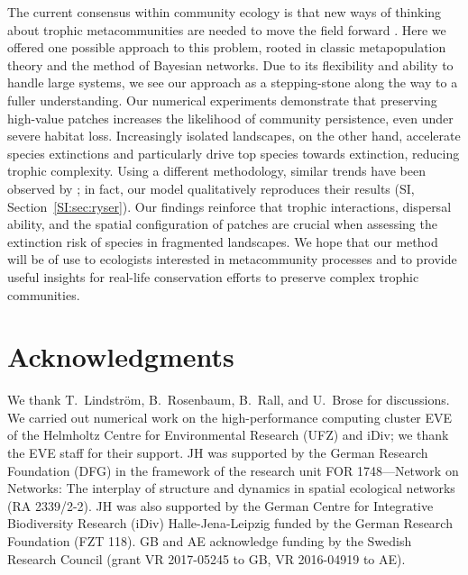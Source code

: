 \documentclass[11pt]{article}
\newcommand{\SI}{SI}
\begin{document}
The current consensus within community ecology is that new ways of thinking about trophic metacommunities are needed to move the field forward \citep{LeiboldChase2018, Guzman2018, Hirtetal2018}. Here we offered one possible approach to this problem, rooted in classic metapopulation theory and the method of Bayesian networks. Due to its flexibility and ability to handle large systems, we see our approach as a stepping-stone along the way to a fuller understanding. Our numerical experiments demonstrate that preserving high-value patches increases the likelihood of community persistence, even under severe habitat loss. Increasingly isolated landscapes, on the other hand, accelerate species extinctions and particularly drive top species towards extinction, reducing trophic complexity.  Using a different methodology, similar trends have been observed by \citet{Ryser2019}; in fact, our model qualitatively reproduces their results (\SI, Section~\ref{SI:sec:ryser}). Our findings reinforce that trophic interactions, dispersal ability, and the spatial configuration of patches are crucial when assessing the extinction risk of species in fragmented landscapes. We hope that our method will be of use to ecologists interested in metacommunity processes and to provide useful insights for real-life conservation efforts to preserve complex trophic communities.



\section*{Acknowledgments} \label{sec:thanks}

We thank T.~Lindstr\"om, B.~Rosenbaum, B.~Rall, and U.~Brose for discussions. We carried out numerical work on the high-performance computing cluster EVE of the Helmholtz Centre for Environmental Research (UFZ) and iDiv; we thank the EVE staff for their support. JH was supported by the German Research Foundation (DFG) in the framework of the research unit FOR 1748---Network on Networks: The interplay of structure and dynamics in spatial ecological networks (RA 2339/2-2). JH was also supported by the German Centre for Integrative Biodiversity Research (iDiv) Halle-Jena-Leipzig funded by the German Research Foundation (FZT 118). GB and AE acknowledge funding by the Swedish Research Council (grant VR 2017-05245 to GB, VR 2016-04919 to AE).





\end{document}
